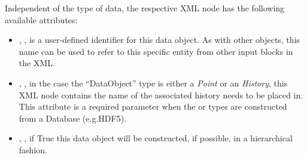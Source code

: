 Independent of the type of data, the respective XML node has the following
available attributes:
\vspace{-5mm}
\begin{itemize}
  \itemsep0em
  \item {}, , is a user-defined
  identifier for this data object.
  \nb As with other objects, this name can be used to refer to this specific
  entity from other input blocks in the XML.

  \item {}, , in the case  the 
   ``DataObject'' type is either a \textit{Point} or an
  \textit{History}, this XML node contains the name of the associated history needs to be placed in.
  \\\nb This attribute is a required parameter when the   or 
   types are constructed from a Database (e.g.HDF5).

  \item {}, , if True
  this data object will be constructed, if possible, in a hierarchical fashion.
\end{itemize}
